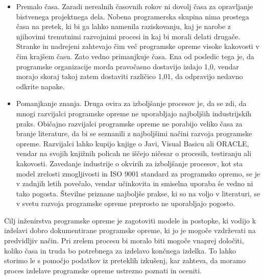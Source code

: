\documentclass[a4paper,12pt,openright]{book}
\begin{document}
\begin{itemize}
    \item Premalo časa. Zaradi nerealnih časovnih rokov ni dovolj časa za opravljanje bistvenega projektnega dela. Nobena programerska skupina nima prostega časa na pretek, ki bi ga lahko namenila raziskovanju, kaj je narobe z njihovimi trenutnimi razvojnimi procesi in kaj bi morali delati drugače. Stranke in nadrejeni zahtevajo čim več programske opreme visoke kakovosti v čim krajšem času. Zato vedno primanjkuje časa. Ena od posledic tega je, da programske organizacije morda pravočasno dostavijo izdajo 1,0, vendar morajo skoraj takoj zatem dostaviti različico 1,01, da odpravijo nedavno odkrite napake.
    \item Pomanjkanje znanja. Druga ovira za izboljšanje procesov je, da se zdi, da mnogi razvijalci programske opreme ne uporabljajo najboljših industrijskih praks. Običajno razvijalci programske opreme ne porabijo veliko časa za branje literature, da bi se seznanili z najboljšimi načini razvoja programske opreme. Razvijalci lahko kupijo knjige o Javi, Visual Basicu ali ORACLE, vendar na svojih knjižnih policah ne iščejo ničesar o procesih, testiranju ali kakovosti.
Zavedanje industrije o okvirih za izboljšanje procesov, kot sta model zrelosti zmogljivosti in ISO 9001 standard za programsko opremo, se je v zadnjih letih povečalo, vendar učinkovita in smiselna uporaba še vedno ni tako pogosta. Številne priznane najboljše prakse, ki so na voljo v literaturi, se v svetu razvoja programske opreme preprosto ne uporabljajo pogosto. \cite{aggarwal2005software}
\end{itemize}
Cilj inženirstva programske opreme je zagotoviti modele in postopke, ki vodijo k izdelavi dobro dokumentirane programske opreme, ki jo je mogoče vzdrževati na predvidljiv način. Pri zrelem procesu bi moralo biti mogoče vnaprej določiti, koliko časa in truda bo potrebnega za izdelavo končnega izdelka. To lahko storimo le s pomočjo podatkov iz preteklih izkušenj, kar zahteva, da moramo proces izdelave programske opreme ustrezno poznati in oceniti. 
\end{document}

